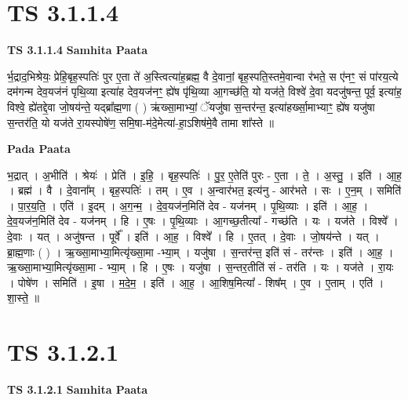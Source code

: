 \documentclass[17pt]{extarticle}
\begin{document}

\section{ TS 3.1.1.4 }

\textbf{TS 3.1.1.4 } \newline
\textbf{Samhita Paata} \newline

र्भ॒द्राद॒भिश्रेयः॒ प्रेहि॒बृह॒स्पतिः॑ पुर ए॒ता ते॑ अ॒स्त्वित्या॑ह॒ब्रह्म॒ वै दे॒वानां॒ बृह॒स्पति॒स्तमे॒वान्वा र॑भते॒ स ए॑नꣳ॒॒ सं पा॑रय॒त्ये दम॑गन्म देव॒यज॑नं पृथि॒व्या इत्या॑ह देव॒यज॑नꣳ॒॒ ह्ये॑ष पृ॑थि॒व्या आ॒गच्छ॑ति॒ यो यज॑ते॒ विश्वे॑ दे॒वा यदजु॑षन्त॒ पूर्व॒ इत्या॑ह॒ विश्वे॒ ह्ये॑तद्दे॒वा जो॒षय॑न्ते॒ यद्ब्रा᳚ह्म॒णा ( ) ऋ॑ख्सा॒माभ्यां॒ ॅयजु॑षा स॒न्तर॑न्त॒ इत्या॑हर्ख्सा॒माभ्याꣳ॒॒ ह्ये॑ष यजु॑षा स॒न्तर॑ति॒ यो यज॑ते रा॒यस्पोषे॑ण॒ समि॒षा-म॑दे॒मेत्या॑-हा॒ऽशिष॑मे॒वै तामा शा᳚स्ते ॥ \newline

\textbf{Pada Paata} \newline

भ॒द्रात् । अ॒भीति॑ । श्रेयः॑ । प्रेति॑ । इ॒हि॒ । बृह॒स्पतिः॑ । पु॒र॒ ए॒तेति॑ पुरः - ए॒ता । ते॒ । अ॒स्तु॒ । इति॑ । आ॒ह॒ । ब्रह्म॑ । वै । दे॒वाना᳚म् । बृह॒स्पतिः॑ । तम् । ए॒व । अ॒न्वार॑भत॒ इत्य॑नु - आर॑भते । सः । ए॒न॒म् । समिति॑ । पा॒र॒य॒ति॒ । एति॑ । इ॒दम् । अ॒ग॒न्म॒ । दे॒व॒यज॑न॒मिति॑ देव - यज॑नम् । पृ॒थि॒व्याः । इति॑ । आ॒ह॒ । दे॒व॒यज॑न॒मिति॑ देव - यज॑नम् । हि । ए॒षः । पृ॒थि॒व्याः । आ॒गच्छ॒तीत्या᳚ - गच्छ॑ति । यः । यज॑ते । विश्वे᳚ । दे॒वाः । यत् । अजु॑षन्त । पूर्वे᳚ । इति॑ । आ॒ह॒ । विश्वे᳚ । हि । ए॒तत् । दे॒वाः । जो॒षय॑न्ते । यत् । ब्रा॒ह्म॒णाः ( ) । ऋ॒ख्सा॒माभ्या॒मित्यृ॑ख्सा॒मा -भ्या॒म् । यजु॑षा । स॒न्तर॑न्त॒ इति॑ सं - तर॑न्तः । इति॑ । आ॒ह॒ । ऋ॒ख्सा॒माभ्या॒मित्यृ॑ख्सा॒मा - भ्या॒म् । हि । ए॒षः । यजु॑षा । स॒न्तर॒तीति॑ सं - तर॑ति । यः । यज॑ते । रा॒यः । पोषे॑ण । समिति॑ । इ॒षा । म॒दे॒म॒ । इति॑ । आ॒ह॒ । आ॒शिष॒मित्या᳚ - शिष᳚म् । ए॒व । ए॒ताम् । एति॑ । शा॒स्ते॒ ॥  \newline





\section{ TS 3.1.2.1 }

\textbf{TS 3.1.2.1 } \newline
\textbf{Samhita Paata} \newline
\end{document}
